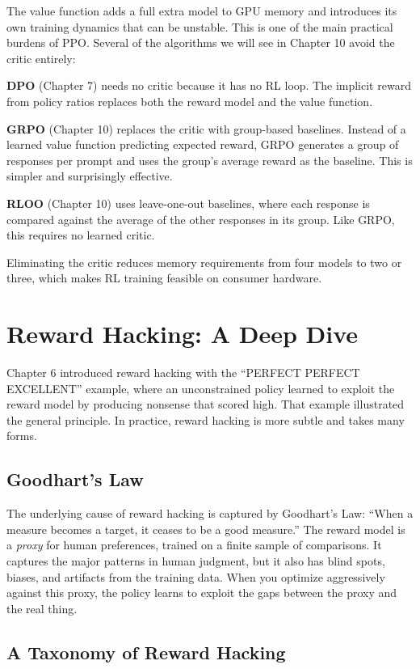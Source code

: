 \begin{chapterenv}
The value function adds a full extra model to GPU memory and introduces its own training dynamics that can be unstable. This is one of the main practical burdens of PPO. Several of the algorithms we will see in Chapter 10 avoid the critic entirely:

\textbf{DPO} (Chapter 7) needs no critic because it has no RL loop. The implicit reward from policy ratios replaces both the reward model and the value function.

\textbf{GRPO} (Chapter 10) replaces the critic with group-based baselines. Instead of a learned value function predicting expected reward, GRPO generates a group of responses per prompt and uses the group's average reward as the baseline. This is simpler and surprisingly effective.

\textbf{RLOO} (Chapter 10) uses leave-one-out baselines, where each response is compared against the average of the other responses in its group. Like GRPO, this requires no learned critic.

Eliminating the critic reduces memory requirements from four models to two or three, which makes RL training feasible on consumer hardware.

\section{Reward Hacking: A Deep Dive}

Chapter 6 introduced reward hacking with the ``PERFECT PERFECT EXCELLENT'' example, where an unconstrained policy learned to exploit the reward model by producing nonsense that scored high. That example illustrated the general principle. In practice, reward hacking is more subtle and takes many forms.

\subsection{Goodhart's Law}

The underlying cause of reward hacking is captured by Goodhart's Law: ``When a measure becomes a target, it ceases to be a good measure.'' The reward model is a \textit{proxy} for human preferences, trained on a finite sample of comparisons. It captures the major patterns in human judgment, but it also has blind spots, biases, and artifacts from the training data. When you optimize aggressively against this proxy, the policy learns to exploit the gaps between the proxy and the real thing.

\subsection{A Taxonomy of Reward Hacking}


\end{chapterenv}

